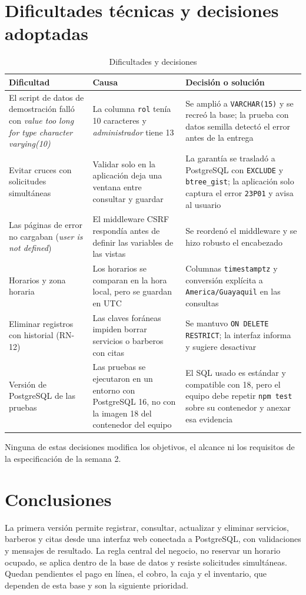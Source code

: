 \documentclass[12pt,a4paper,oneside]{article}
\begin{document}
\section{Dificultades t\'ecnicas y decisiones adoptadas}
\begin{table}[H]\centering\small
\begin{tabularx}{\textwidth}{>{\raggedright\arraybackslash}p{4.2cm}YY}\toprule
\textbf{Dificultad} & \textbf{Causa} & \textbf{Decisi\'on o soluci\'on}\\\midrule
El script de datos de demostraci\'on fall\'o con \emph{value too long for type character varying(10)} & La columna \texttt{rol} ten\'ia 10 caracteres y \emph{administrador} tiene 13 & Se ampli\'o a \texttt{VARCHAR(15)} y se recre\'o la base; la prueba con datos semilla detect\'o el error antes de la entrega\\
Evitar cruces con solicitudes simult\'aneas & Validar solo en la aplicaci\'on deja una ventana entre consultar y guardar & La garant\'ia se traslad\'o a PostgreSQL con \texttt{EXCLUDE} y \texttt{btree\_gist}; la aplicaci\'on solo captura el error \texttt{23P01} y avisa al usuario\\
Las p\'aginas de error no cargaban (\emph{user is not defined}) & El middleware CSRF respond\'ia antes de definir las variables de las vistas & Se reorden\'o el middleware y se hizo robusto el encabezado\\
Horarios y zona horaria & Los horarios se comparan en la hora local, pero se guardan en UTC & Columnas \texttt{timestamptz} y conversi\'on expl\'icita a \texttt{America/Guayaquil} en las consultas\\
Eliminar registros con historial (RN-12) & Las claves for\'aneas impiden borrar servicios o barberos con citas & Se mantuvo \texttt{ON DELETE RESTRICT}; la interfaz informa y sugiere desactivar\\
Versi\'on de PostgreSQL de las pruebas & Las pruebas se ejecutaron en un entorno con PostgreSQL 16, no con la imagen 18 del contenedor del equipo & El SQL usado es est\'andar y compatible con 18, pero el equipo debe repetir \texttt{npm test} sobre su contenedor y anexar esa evidencia\\\bottomrule
\end{tabularx}
\caption{Dificultades y decisiones}\end{table}
Ninguna de estas decisiones modifica los objetivos, el alcance ni los requisitos de la especificaci\'on de la semana 2.

\section{Conclusiones}
La primera versi\'on permite registrar, consultar, actualizar y eliminar servicios, barberos y citas desde una interfaz web conectada a PostgreSQL, con validaciones y mensajes de resultado. La regla central del negocio, no reservar un horario ocupado, se aplica dentro de la base de datos y resiste solicitudes simult\'aneas. Quedan pendientes el pago en l\'inea, el cobro, la caja y el inventario, que dependen de esta base y son la siguiente prioridad.
\end{document}
